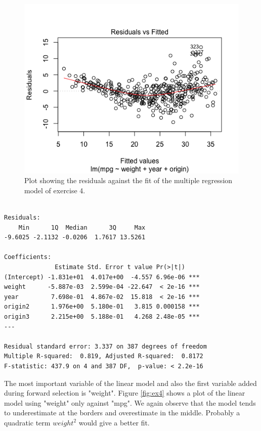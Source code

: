 \documentclass{paper}
\begin{document}
\begin{figure}
  \begin{center}
    \quad\quad
    \includegraphics[width=.8\linewidth]{res4}
  \end{center}
  \caption{Plot showing the residuals against the fit of the multiple regression
   model of exercise 4.}
   \label{fig:res4}
\end{figure}

\begin{minipage}{\linewidth}
  \begin{lstlisting}[caption={Summary of multiple regression fit for exercise 4},
    label=list:res4]

Residuals:
    Min      1Q  Median      3Q     Max
-9.6025 -2.1132 -0.0206  1.7617 13.5261

Coefficients:
              Estimate Std. Error t value Pr(>|t|)
(Intercept) -1.831e+01  4.017e+00  -4.557 6.96e-06 ***
weight      -5.887e-03  2.599e-04 -22.647  < 2e-16 ***
year         7.698e-01  4.867e-02  15.818  < 2e-16 ***
origin2      1.976e+00  5.180e-01   3.815 0.000158 ***
origin3      2.215e+00  5.188e-01   4.268 2.48e-05 ***
---

Residual standard error: 3.337 on 387 degrees of freedom
Multiple R-squared:  0.819,	Adjusted R-squared:  0.8172
F-statistic: 437.9 on 4 and 387 DF,  p-value: < 2.2e-16

  \end{lstlisting}
\end{minipage}

The most important variable of the linear model  and also the first
variable added during forward selection is "weight". Figure \ref{fig:ex4} shows a
plot of the linear model using "weight" only against "mpg". We again observe that
the model tends to underestimate at the borders and overestimate in the middle.
Probably a quadratic term $weight^2$ would give a better fit.
\end{document}
